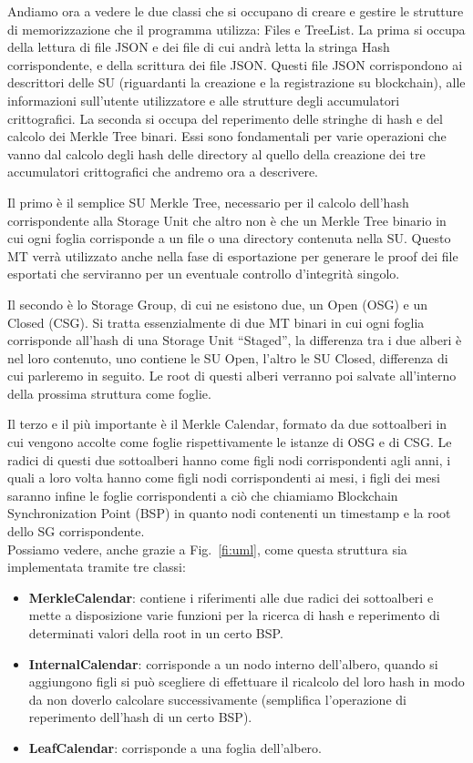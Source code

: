 Andiamo ora a vedere le due classi che si occupano di creare e gestire le strutture di memorizzazione che il programma utilizza: Files e TreeList.
La prima si occupa della lettura di file JSON e dei file di cui andrà letta la stringa Hash corrispondente, e della scrittura dei file JSON. Questi file JSON corrispondono ai descrittori delle SU (riguardanti la creazione e la registrazione su blockchain), alle informazioni sull’utente utilizzatore e alle strutture degli accumulatori crittografici.
La seconda si occupa del reperimento delle stringhe di hash e del calcolo dei Merkle Tree binari.
Essi sono fondamentali per varie operazioni che vanno dal calcolo degli hash delle directory al quello della creazione dei tre accumulatori crittografici che andremo ora a descrivere.

Il primo è il semplice SU Merkle Tree, necessario per il calcolo dell’hash corrispondente alla Storage Unit che altro non è che un Merkle Tree binario in cui ogni foglia corrisponde a un file o una directory contenuta nella SU. Questo MT verrà utilizzato anche nella fase di esportazione per generare le proof dei file esportati che serviranno per un eventuale controllo d’integrità singolo.

Il secondo è lo Storage Group, di cui ne esistono due, un Open (OSG) e un Closed (CSG). Si tratta essenzialmente di due MT binari in cui ogni foglia corrisponde all’hash di una Storage Unit “Staged”, la differenza tra i due alberi è nel loro contenuto, uno contiene le SU Open, l’altro le SU Closed, differenza di cui parleremo in seguito. Le root di questi alberi verranno poi salvate all’interno della prossima struttura come foglie.

Il terzo e il più importante è il Merkle Calendar, formato da due sottoalberi in cui vengono accolte come foglie rispettivamente le istanze di OSG e di CSG. Le radici di questi due sottoalberi hanno come figli nodi corrispondenti agli anni, i quali a loro volta hanno come figli nodi corrispondenti ai mesi, i figli dei mesi saranno infine le foglie corrispondenti a ciò che chiamiamo Blockchain Synchronization Point (BSP) in quanto nodi contenenti un timestamp e la root dello SG corrispondente.
\\
Possiamo vedere, anche grazie a Fig.~\ref{fi:uml}, come questa struttura sia implementata tramite tre classi:

\begin{itemize}
    \item \textbf{MerkleCalendar}: contiene i riferimenti alle due radici dei sottoalberi e mette a disposizione varie funzioni per la ricerca di hash e reperimento di determinati valori della root in un certo BSP.
    \item \textbf{InternalCalendar}: corrisponde a un nodo interno dell’albero, quando si aggiungono figli si può scegliere di effettuare il ricalcolo del loro hash in modo da non doverlo calcolare successivamente (semplifica l’operazione di reperimento dell’hash di un certo BSP).
    \item \textbf{LeafCalendar}: corrisponde a una foglia dell’albero.
\end{itemize}


